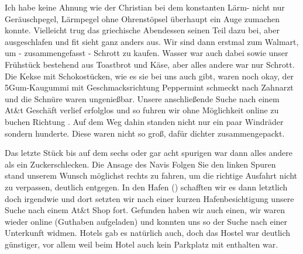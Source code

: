 Ich habe keine Ahnung wie der Christian bei dem konstanten Lärm- nicht nur Geräuschpegel, Lärmpegel ohne Ohrenstöpsel überhaupt ein Auge zumachen konnte.
Vielleicht trug das griechische Abendessen seinen Teil dazu bei, aber ausgeschlafen und fit sieht ganz anders aus.
Wir sind dann erstmal zum Walmart, um - zusammengefasst - Schrott zu kaufen.
Wasser war auch dabei sowie unser Frühstück bestehend aus Toastbrot und Käse, aber alles andere war nur Schrott.
Die Kekse mit Schokostücken, wie es sie bei uns auch gibt, waren noch okay, der 5Gum-Kaugummi mit Geschmacksrichtung Peppermint schmeckt nach Zahnarzt und die Schnüre waren ungenießbar.
Unsere anschließende Suche nach einem At\&t Geschäft verlief erfolglos und so fuhren wir ohne Möglichkeit online zu buchen Richtung .
Auf dem Weg dahin standen nicht nur ein paar Windräder sondern hunderte.
Diese waren nicht so groß, dafür dichter zusammengepackt.


Das letzte Stück bis  auf dem sechs oder gar acht spurigen  war dann alles andere als ein Zuckerschlecken.
Die Ansage des Navis \flqq Folgen Sie den linken Spuren\frqq \, stand unserem Wunsch möglichst rechts zu fahren, um die richtige Ausfahrt nicht zu verpassen, deutlich entgegen.
In den Hafen () schafften wir es dann letztlich doch irgendwie und dort setzten wir nach einer kurzen Hafenbesichtigung unsere Suche nach einem At\&t Shop fort.
Gefunden haben wir auch einen, wir waren wieder online (Guthaben aufgeladen) und konnten uns so der Suche nach einer Unterkunft widmen.
Hotels gab es natürlich auch, doch das Hostel war deutlich günstiger, vor allem weil beim Hotel auch kein Parkplatz mit enthalten war.

